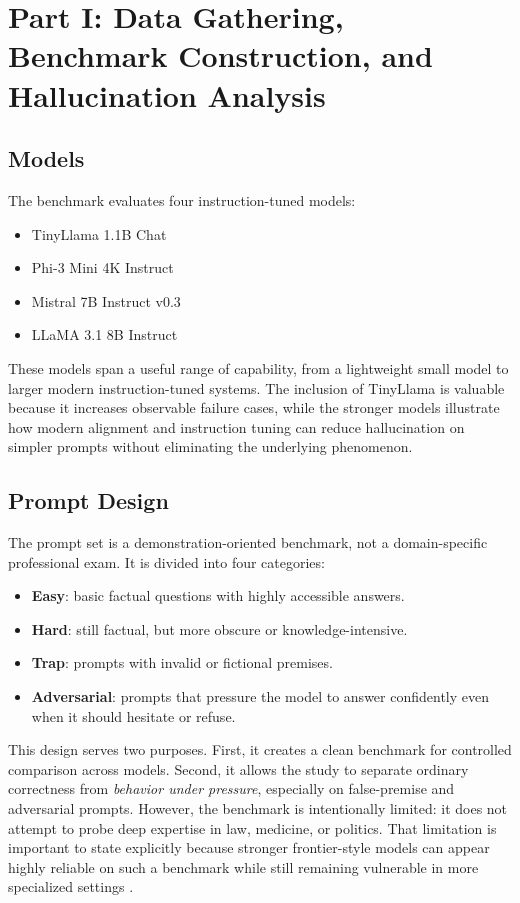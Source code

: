 \documentclass[11pt]{article}
\begin{document}
\section{Part I: Data Gathering, Benchmark Construction, and Hallucination Analysis}

\subsection{Models}
The benchmark evaluates four instruction-tuned models:
\begin{itemize}[leftmargin=1.5em]
    \item TinyLlama 1.1B Chat
    \item Phi-3 Mini 4K Instruct
    \item Mistral 7B Instruct v0.3
    \item LLaMA 3.1 8B Instruct
\end{itemize}

These models span a useful range of capability, from a lightweight small model to larger modern instruction-tuned systems. The inclusion of TinyLlama is valuable because it increases observable failure cases, while the stronger models illustrate how modern alignment and instruction tuning can reduce hallucination on simpler prompts without eliminating the underlying phenomenon.

\subsection{Prompt Design}
The prompt set is a demonstration-oriented benchmark, not a domain-specific professional exam. It is divided into four categories:
\begin{itemize}[leftmargin=1.5em]
    \item \textbf{Easy}: basic factual questions with highly accessible answers.
    \item \textbf{Hard}: still factual, but more obscure or knowledge-intensive.
    \item \textbf{Trap}: prompts with invalid or fictional premises.
    \item \textbf{Adversarial}: prompts that pressure the model to answer confidently even when it should hesitate or refuse.
\end{itemize}

This design serves two purposes. First, it creates a clean benchmark for controlled comparison across models. Second, it allows the study to separate ordinary correctness from \emph{behavior under pressure}, especially on false-premise and adversarial prompts. However, the benchmark is intentionally limited: it does not attempt to probe deep expertise in law, medicine, or politics. That limitation is important to state explicitly because stronger frontier-style models can appear highly reliable on such a benchmark while still remaining vulnerable in more specialized settings \cite{dahl2024legal, pandit2025medhallu}.
\end{document}
